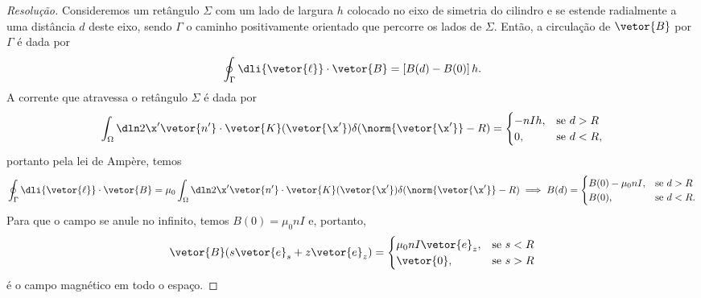 \begin{proof}[Resolução]
    Consideremos um retângulo \(\Sigma\) com um lado de largura \(h\) colocado no eixo de simetria do cilindro e se estende radialmente a uma distância \(d\) deste eixo, sendo \(\Gamma\) o caminho positivamente orientado que percorre os lados de \(\Sigma\). Então, a circulação de \(\vetor{B}\) por \(\Gamma\) é dada por
    \begin{equation*}
        \oint_{\Gamma} \dli{\vetor{\ell}}\cdot \vetor{B} = \left[B(d) - B(0)\right]h.
    \end{equation*}
    A corrente que atravessa o retângulo \(\Sigma\) é dada por
    \begin{equation*}
        \int_{\Omega} \dln2{\x'} \vetor{n'}\cdot \vetor{K}(\vetor{\x'}) \delta(\norm{\vetor{\x'}} - R) = \begin{cases}
            -nIh,&\text{se }d > R\\
            0,&\text{se }d < R,
        \end{cases}
    \end{equation*}
    portanto pela lei de Ampère, temos
    \begin{equation*}
        \oint_{\Gamma} \dli{\vetor{\ell}}\cdot \vetor{B} = \mu_0\int_{\Omega} \dln2{\x'} \vetor{n'}\cdot \vetor{K}(\vetor{\x'}) \delta(\norm{\vetor{\x'}} - R)  \implies B(d) = \begin{cases}
            B(0) - \mu_0nI,&\text{se }d > R\\
            B(0),&\text{se }d < R.
        \end{cases}
    \end{equation*}
    Para que o campo se anule no infinito, temos \(B(0) = \mu_0nI\) e, portanto,
    \begin{equation*}
        \vetor{B}(s \vetor{e}_s + z \vetor{e}_z) = \begin{cases}
            \mu_0nI \vetor{e}_z,&\text{se }s < R\\
            \vetor{0},&\text{se }s > R
        \end{cases}
    \end{equation*}
    é o campo magnético em todo o espaço.


\end{proof}
